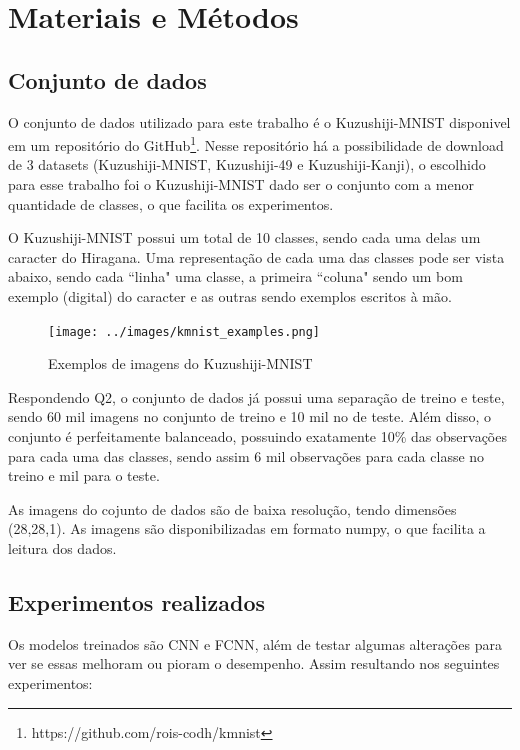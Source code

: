 \documentclass[12pt]{article}
\begin{document}
\section{Materiais e Métodos} 

\subsection{Conjunto de dados}

O conjunto de dados utilizado para este trabalho é o Kuzushiji-MNIST \cite{DBLP:journals/corr/abs-1812-01718} disponivel em um repositório do GitHub\footnote{https://github.com/rois-codh/kmnist}. Nesse repositório há a possibilidade de download de 3 datasets (Kuzushiji-MNIST, Kuzushiji-49 e Kuzushiji-Kanji), o escolhido para esse trabalho foi o Kuzushiji-MNIST dado ser o conjunto com a menor quantidade de classes, o que facilita os experimentos. 

O Kuzushiji-MNIST possui um total de 10 classes, sendo cada uma delas um caracter do Hiragana. Uma representação de cada uma das classes pode ser vista abaixo, sendo cada ``linha" uma classe, a primeira ``coluna" sendo um bom exemplo (digital) do caracter e as outras sendo exemplos escritos à mão.

\begin{figure}[ht]
  \centering
  \texttt{[image: ../images/kmnist\_examples.png]}
  \caption{Exemplos de imagens do Kuzushiji-MNIST}
  \label{fig:kmnist-examples}
\end{figure}

Respondendo Q2, o conjunto de dados já possui uma separação de treino e teste, sendo 60 mil imagens no conjunto de treino e 10 mil no de teste. Além disso, o conjunto é perfeitamente balanceado, possuindo exatamente 10\% das observações para cada uma das classes, sendo assim 6 mil observações para cada classe no treino e mil para o teste.

As imagens do cojunto de dados são de baixa resolução, tendo dimensões (28,28,1). As imagens são disponibilizadas em formato numpy, o que facilita a leitura dos dados.


\subsection{Experimentos realizados}

Os modelos treinados são CNN  e FCNN, além de testar algumas alterações para ver se essas melhoram ou pioram o desempenho. Assim resultando nos seguintes experimentos:
\end{document}
